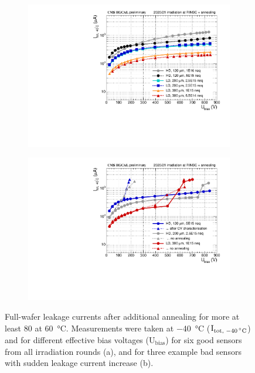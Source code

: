\begin{figure}
	\captionsetup[subfigure]{aboveskip=-1pt,belowskip=-1pt}
	\centering
	\begin{subfigure}[b]{0.49\textwidth}
		\includegraphics[width=0.999\textwidth]{plots/total_iv/total_current_IV.pdf}
		\subcaption{
		}
		\label{plot:tot_IV_good}
	\end{subfigure}
	\hfill
	\begin{subfigure}[b]{0.49\textwidth}
		\includegraphics[width=0.999\textwidth]{plots/total_iv/total_current_IV_bad.pdf}
		\subcaption{
		}
		\label{plot:tot_IV_bad}
	\end{subfigure}
	\caption{
		Full-wafer leakage currents after additional annealing for more at least \SI{80}{\min} at \SI{60}{\celsius}. Measurements were taken at \SI{-40}{\celsius} ($\text{I}_\text{tot, \SI{-40}{\celsius}}$) and for different effective bias voltages ($\text{U}_\text{bias}$) 
		for six good sensors from all irradiation rounds (a), and for three example bad sensors with sudden leakage current increase (b).
	}
\end{figure}



